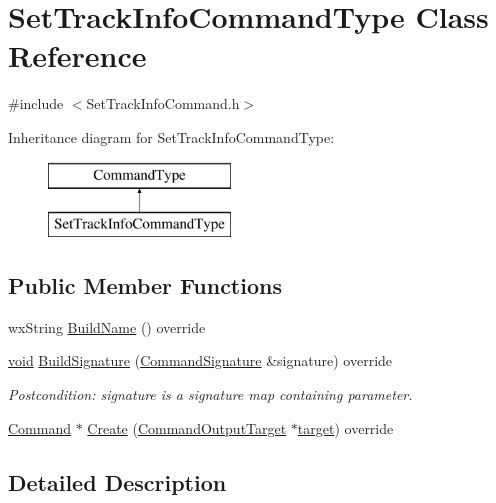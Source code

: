 \hypertarget{class_set_track_info_command_type}{}\section{Set\+Track\+Info\+Command\+Type Class Reference}
\label{class_set_track_info_command_type}


{\ttfamily \#include $<$Set\+Track\+Info\+Command.\+h$>$}

Inheritance diagram for Set\+Track\+Info\+Command\+Type\+:\begin{figure}[H]
\begin{center}
\leavevmode
\includegraphics[height=2.000000cm]{class_set_track_info_command_type}
\end{center}
\end{figure}
\subsection*{Public Member Functions}
\begin{DoxyCompactItemize}
\item 
wx\+String \hyperlink{class_set_track_info_command_type_a9de0a3fd2579880c87fb00c6b4997f7a}{Build\+Name} () override
\item 
\hyperlink{sound_8c_ae35f5844602719cf66324f4de2a658b3}{void} \hyperlink{class_set_track_info_command_type_a1395e432e8e4abba3415f3c39b03ac8c}{Build\+Signature} (\hyperlink{class_command_signature}{Command\+Signature} \&signature) override
\begin{DoxyCompactList}\small\item\em Postcondition\+: signature is a \textquotesingle{}signature\textquotesingle{} map containing parameter. \end{DoxyCompactList}\item 
\hyperlink{class_command}{Command} $\ast$ \hyperlink{class_set_track_info_command_type_acbc64b02d8f4c7b04ab2aad091d90501}{Create} (\hyperlink{class_command_output_target}{Command\+Output\+Target} $\ast$\hyperlink{lib_2expat_8h_a15a257516a87decb971420e718853137}{target}) override
\end{DoxyCompactItemize}


\subsection{Detailed Description}


